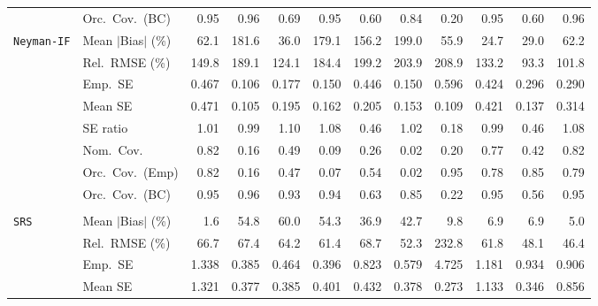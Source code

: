 \begin{landscape}
\begin{longtable}{llrrrrrrrrrr}
 & Orc.\ Cov.\ (BC) & \cellcolor{rankone}0.95 & \cellcolor{ranktwo}0.96 & 0.69 & \cellcolor{rankone}0.95 & 0.60 & \cellcolor{rankthree}0.84 & 0.20 & \cellcolor{rankone}0.95 & 0.60 & \cellcolor{ranktwo}0.96 \\
\addlinespace[2pt]
\quad \texttt{Neyman-IF} & Mean $|$Bias$|$ (\%) & 62.1 & 181.6 & \cellcolor{rankthree}36.0 & 179.1 & 156.2 & 199.0 & 55.9 & \cellcolor{rankone}24.7 & \cellcolor{ranktwo}29.0 & 62.2 \\
 & Rel.\ RMSE (\%) & 149.8 & 189.1 & \cellcolor{rankthree}124.1 & 184.4 & 199.2 & 203.9 & 208.9 & 133.2 & \cellcolor{rankone}93.3 & \cellcolor{ranktwo}101.8 \\
 & Emp.\ SE & 0.467 & 0.106 & 0.177 & 0.150 & 0.446 & 0.150 & 0.596 & 0.424 & 0.296 & 0.290 \\
 & Mean SE & 0.471 & 0.105 & 0.195 & 0.162 & 0.205 & 0.153 & 0.109 & 0.421 & 0.137 & 0.314 \\
 & SE ratio & \cellcolor{rankone}1.01 & \cellcolor{rankone}0.99 & 1.10 & \cellcolor{rankthree}1.08 & 0.46 & \cellcolor{ranktwo}1.02 & 0.18 & \cellcolor{rankone}0.99 & 0.46 & \cellcolor{rankthree}1.08 \\
 & Nom.\ Cov. & \cellcolor{rankone}0.82 & 0.16 & \cellcolor{rankthree}0.49 & 0.09 & 0.26 & 0.02 & 0.20 & \cellcolor{ranktwo}0.77 & 0.42 & \cellcolor{rankone}0.82 \\
 & Orc.\ Cov.\ (Emp) & \cellcolor{rankthree}0.82 & 0.16 & 0.47 & 0.07 & 0.54 & 0.02 & \cellcolor{rankone}0.95 & 0.78 & \cellcolor{ranktwo}0.85 & 0.79 \\
 & Orc.\ Cov.\ (BC) & \cellcolor{rankone}0.95 & \cellcolor{ranktwo}0.96 & \cellcolor{rankthree}0.93 & \cellcolor{ranktwo}0.94 & 0.63 & 0.85 & 0.22 & \cellcolor{rankone}0.95 & 0.56 & \cellcolor{rankone}0.95 \\
\addlinespace[2pt]
\multicolumn{12}{l}{\textbf{Binary \& Categorical Phase-One Covariates}} \\
\addlinespace[2pt]
\quad \texttt{SRS} & Mean $|$Bias$|$ (\%) & \cellcolor{rankone}1.6 & 54.8 & 60.0 & 54.3 & 36.9 & 42.7 & 9.8 & \cellcolor{rankthree}6.9 & \cellcolor{rankthree}6.9 & \cellcolor{ranktwo}5.0 \\
 & Rel.\ RMSE (\%) & 66.7 & 67.4 & 64.2 & 61.4 & 68.7 & \cellcolor{rankthree}52.3 & 232.8 & 61.8 & \cellcolor{ranktwo}48.1 & \cellcolor{rankone}46.4 \\
 & Emp.\ SE & 1.338 & 0.385 & 0.464 & 0.396 & 0.823 & 0.579 & 4.725 & 1.181 & 0.934 & 0.906 \\
 & Mean SE & 1.321 & 0.377 & 0.385 & 0.401 & 0.432 & 0.378 & 0.273 & 1.133 & 0.346 & 0.856 \\

\end{longtable}
\end{landscape}
